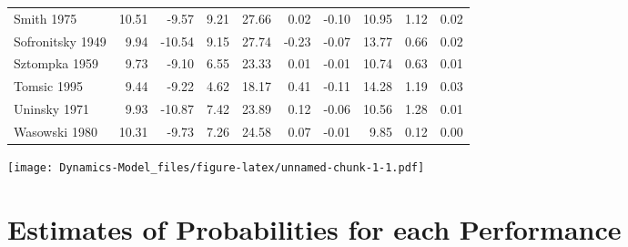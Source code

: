 \documentclass[12pt]{article}
\begin{document}
\begin{table}[H]
\begin{tabular}{lrrrrrrrrr}
Smith 1975 & 10.51 & -9.57 & 9.21 & 27.66 & 0.02 & -0.10 & 10.95 & 1.12 & 0.02\\
\rowcolor{gray!6}  Sofronitsky 1949 & 9.94 & -10.54 & 9.15 & 27.74 & -0.23 & -0.07 & 13.77 & 0.66 & 0.02\\
Sztompka 1959 & 9.73 & -9.10 & 6.55 & 23.33 & 0.01 & -0.01 & 10.74 & 0.63 & 0.01\\
\addlinespace
\rowcolor{gray!6}  Tomsic 1995 & 9.44 & -9.22 & 4.62 & 18.17 & 0.41 & -0.11 & 14.28 & 1.19 & 0.03\\
Uninsky 1971 & 9.93 & -10.87 & 7.42 & 23.89 & 0.12 & -0.06 & 10.56 & 1.28 & 0.01\\
\rowcolor{gray!6}  Wasowski 1980 & 10.31 & -9.73 & 7.26 & 24.58 & 0.07 & -0.01 & 9.85 & 0.12 & 0.00\\
\bottomrule
\end{tabular}
\end{table}

\texttt{[image: Dynamics-Model\_files/figure-latex/unnamed-chunk-1-1.pdf]}

\newpage

\section{Estimates of Probabilities for each Performance}
\label{appendixb}
\end{document}
